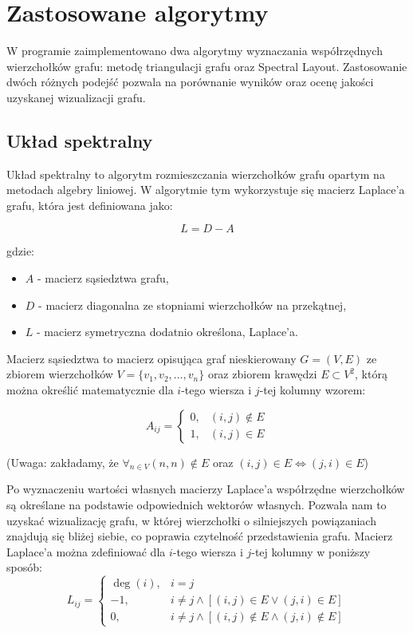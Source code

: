 \documentclass[11pt,a4paper]{article}
\begin{document}
\section{Zastosowane algorytmy}

W programie zaimplementowano dwa algorytmy wyznaczania współrzędnych wierzchołków grafu: metodę triangulacji grafu oraz Spectral Layout. Zastosowanie dwóch różnych podejść pozwala na porównanie wyników oraz ocenę jakości uzyskanej wizualizacji grafu.

\subsection{Układ spektralny}
Układ spektralny to algorytm rozmieszczania wierzchołków grafu opartym na metodach algebry liniowej. W algorytmie tym wykorzystuje się macierz Laplace’a grafu, która jest definiowana jako:

$$ L = D - A $$

\noindent gdzie:
\begin{itemize}
\item $A$ - macierz sąsiedztwa grafu,
\item $D$ - macierz diagonalna ze stopniami wierzchołków na przekątnej,
\item $L$ - macierz symetryczna dodatnio określona, Laplace'a.
\end{itemize}

Macierz sąsiedztwa to macierz opisująca graf nieskierowany $G = (V, E)$ ze zbiorem wierzchołków $V = \{v_1, v_2, \ldots, v_n\}$ oraz zbiorem krawędzi $E \subset V^2$, którą można określić matematycznie dla $i$-tego wiersza i $j$-tej kolumny wzorem:

\[A_{ij} = \begin{cases}
	0,& (i, j) \notin E \\
	1,& (i, j) \in E
\end{cases}\]

\noindent (Uwaga: zakładamy, że $\forall_{n \in V} (n, n) \notin E$ oraz $(i,j) \in E \iff (j,i) \in E$)

Po wyznaczeniu wartości własnych macierzy Laplace’a współrzędne wierzchołków są określane na podstawie odpowiednich wektorów własnych. Pozwala nam to uzyskać wizualizację grafu, w której wierzchołki o silniejszych powiązaniach znajdują się bliżej siebie, co poprawia czytelność przedstawienia grafu. Macierz Laplace'a można zdefiniować dla $i$-tego wiersza i $j$-tej kolumny w poniższy sposób:
\[L_{ij} = \begin{cases}
	\deg(i),& i = j \\
	-1,& i \neq j \land [(i, j) \in E \lor (j, i) \in E] \\
	0,& i \neq j \land [(i, j) \notin E \land (j, i) \notin E]
\end{cases}\]
\end{document}
